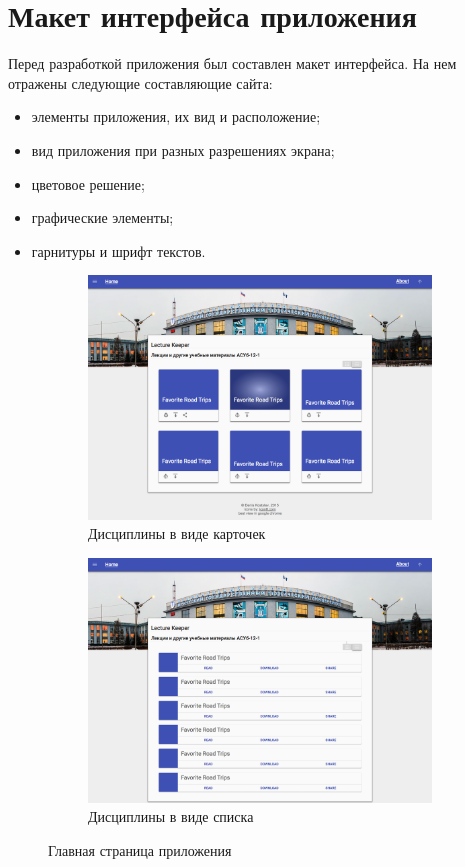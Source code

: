 \chapter{Макет интерфейса приложения}

Перед разработкой приложения был составлен макет интерфейса. На нем отражены следующие составляющие сайта:
\begin{itemize}
	\item элементы приложения, их вид и расположение;
	\item вид приложения при разных разрешениях экрана;
	\item цветовое решение;
	\item графические элементы;
	\item гарнитуры и шрифт текстов.
\end{itemize}

\begin{figure}[h!]
	\begin{subfigure}[l]{0.45\textwidth}
		\includegraphics[width=\textwidth]{pics/sketches/main_card.png}
		\caption{Дисциплины в виде карточек}
	\end{subfigure}
	\quad
	\begin{subfigure}[r]{0.45\textwidth}
		\includegraphics[width=\textwidth]{pics/sketches/main_list.png}
		\caption{Дисциплины в виде списка}
	\end{subfigure}
	\caption{Главная страница приложения}
\end{figure}

